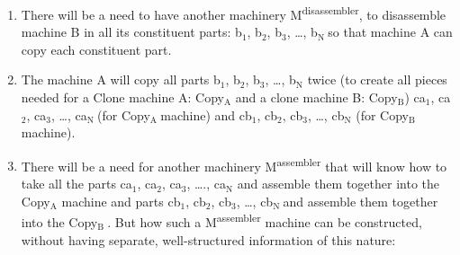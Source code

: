 \documentclass[letterpaper]{article}
\newcommand\textsubscript[1]{\ensuremath{{}_{\text{#1}}}}
\begin{document}
\begin{enumerate}
\item There will be a need to have another machinery
M\textsuperscript{disassembler}, to disassemble machine B in all its
constituent parts: b\textsubscript{1}, b\textsubscript{2},
b\textsubscript{3}, …, b\textsubscript{N }so that machine A can copy
each constituent part.
\item The machine A will copy all parts b\textsubscript{1},
b\textsubscript{2}, b\textsubscript{3}, …, b\textsubscript{N} twice (to
create all pieces needed for a Clone machine A: Copy\textsubscript{A}
and a clone machine B: Copy\textsubscript{B}) ca\textsubscript{1},
ca\textsubscript{2}, ca\textsubscript{3}, …, ca\textsubscript{N }(for
Copy\textsubscript{A }machine) and cb\textsubscript{1},
cb\textsubscript{2}, cb\textsubscript{3}, …, cb\textsubscript{N} (for
Copy\textsubscript{B} machine).
\item There will be a need for another machinery
M\textsuperscript{assembler }that will know how to take all the parts
ca\textsubscript{1}, ca\textsubscript{2}, ca\textsubscript{3}, ….,
ca\textsubscript{N} and assemble them together into the
Copy\textsubscript{A} machine and parts cb\textsubscript{1},
cb\textsubscript{2}, cb\textsubscript{3}, …, cb\textsubscript{N }and
assemble them together into the Copy\textsubscript{B }. But how such a
M\textsuperscript{assembler} machine can be constructed, without having
separate, well-structured information of this nature:
\end{enumerate}
\end{document}
